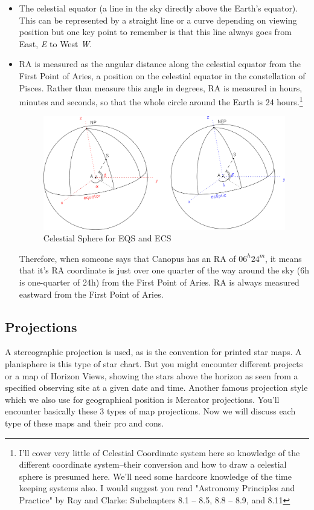 \documentclass[a4paper,12pt]{extarticle}
\begin{document}
\begin{itemize}
    \item The celestial equator (a line in the sky directly above the Earth’s equator). This can be represented by a straight line or a curve depending on viewing position but one key point to remember is that this line always goes from East, \textit{E} to West\textit{ W}.
    \item RA is measured as the angular distance along the celestial equator from the First Point of Aries, a position on the celestial equator in the constellation of Pisces. Rather than measure this angle in degrees, RA is measured in hours, minutes and seconds, so that the whole circle around the Earth is 24 hours.\footnote{I'll cover very little of Celestial Coordinate system here so knowledge of the different coordinate system--their conversion and how to draw a celestial sphere is presumed here. We'll need some hardcore knowledge of the time keeping systems also. I would suggest you read "Astronomy Principles and Practice" by Roy and Clarke: Subchapters 8.1 – 8.5, 8.8 – 8.9, and 8.11}
    
    \begin{figure}[H]
    \centering
    \includegraphics[width=\linewidth]{cel.png}
    \caption{Celestial Sphere for EQS and ECS}
\end{figure}
    
    Therefore, when someone says that Canopus has an RA of $06^h 24^m$, it means that it's RA coordinate is just over one quarter of the way around the sky (6h is one-quarter of 24h) from the First Point of Aries. RA is always measured eastward from the First Point of Aries.
\end{itemize}

\subsection{Projections}
A stereographic projection is used, as is the convention for printed star maps. A planisphere is this type of star chart. But you might encounter different projects or a map of Horizon Views, showing the stars above the horizon as seen from a specified observing site at a given date and time. Another famous projection style which we also use for geographical position is Mercator projections. You'll encounter basically these 3 types of map projections. Now we will discuss each type of these maps and their pro and cons. 
\end{document}
